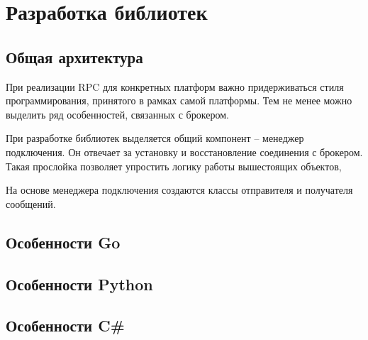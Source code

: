 \section{Разработка библиотек}

\subsection{Общая архитектура}
При реализации RPC для конкретных платформ важно придерживаться стиля
программирования, принятого в рамках самой платформы. Тем не менее
можно выделить ряд особенностей, связанных с брокером.

При разработке библиотек выделяется общий компонент -- менеджер подключения.
Он отвечает за установку и восстановление соединения с брокером.
Такая прослойка позволяет упростить логику работы вышестоящих объектов,

На основе менеджера подключения создаются классы отправителя и получателя
сообщений.

\subsection{Особенности Go}
\subsection{Особенности Python}
\subsection{Особенности C\#}
